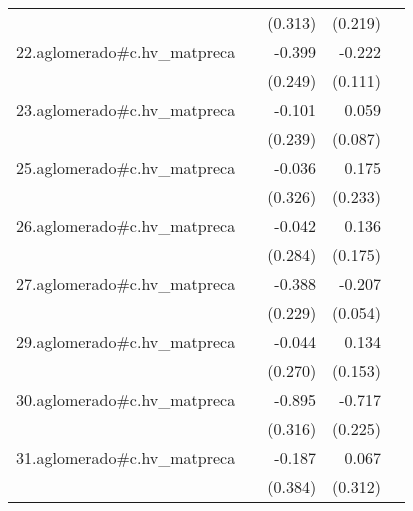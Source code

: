 {\begin{longtable}{l*{4}{D{.}{.}{-1}}}
            &                     &     (0.313)         &     (0.219)         &                     \\
\addlinespace
22.aglomerado#c.hv\_matpreca&                     &      -0.399         &      -0.222\sym{*}  &                     \\
            &                     &     (0.249)         &     (0.111)         &                     \\
\addlinespace
23.aglomerado#c.hv\_matpreca&                     &      -0.101         &       0.059         &                     \\
            &                     &     (0.239)         &     (0.087)         &                     \\
\addlinespace
25.aglomerado#c.hv\_matpreca&                     &      -0.036         &       0.175         &                     \\
            &                     &     (0.326)         &     (0.233)         &                     \\
\addlinespace
26.aglomerado#c.hv\_matpreca&                     &      -0.042         &       0.136         &                     \\
            &                     &     (0.284)         &     (0.175)         &                     \\
\addlinespace
27.aglomerado#c.hv\_matpreca&                     &      -0.388         &      -0.207\sym{***}&                     \\
            &                     &     (0.229)         &     (0.054)         &                     \\
\addlinespace
29.aglomerado#c.hv\_matpreca&                     &      -0.044         &       0.134         &                     \\
            &                     &     (0.270)         &     (0.153)         &                     \\
\addlinespace
30.aglomerado#c.hv\_matpreca&                     &      -0.895\sym{**} &      -0.717\sym{**} &                     \\
            &                     &     (0.316)         &     (0.225)         &                     \\
\addlinespace
31.aglomerado#c.hv\_matpreca&                     &      -0.187         &       0.067         &                     \\
            &                     &     (0.384)         &     (0.312)         &                     \\

\end{longtable}}
